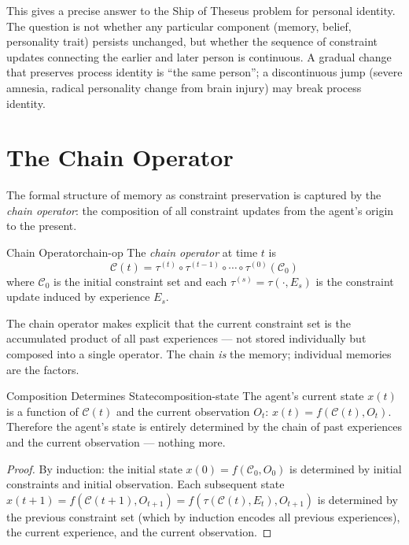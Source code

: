 \begin{remark}
  This gives a precise answer to the Ship of Theseus problem for
  personal identity. The question is not whether any particular component
  (memory, belief, personality trait) persists unchanged, but whether the
  sequence of constraint updates connecting the earlier and later person
  is continuous. A gradual change that preserves process identity is
  ``the same person''; a discontinuous jump (severe amnesia, radical
  personality change from brain injury) may break process identity.
\end{remark}

\section{The Chain Operator}

The formal structure of memory as constraint preservation is captured
by the \emph{chain operator}: the composition of all constraint updates
from the agent's origin to the present.

\begin{definition}{Chain Operator}{chain-op}
  The \emph{chain operator} at time $t$ is
  \[
    \mathcal{C}(t) = \tau^{(t)} \circ \tau^{(t-1)} \circ \cdots
    \circ \tau^{(0)}(\mathcal{C}_0)
  \]
  where $\mathcal{C}_0$ is the initial constraint set and each
  $\tau^{(s)} = \tau(\cdot, E_s)$ is the constraint update induced
  by experience $E_s$.
\end{definition}

The chain operator makes explicit that the current constraint set is
the accumulated product of all past experiences — not stored individually
but composed into a single operator. The chain \emph{is} the memory;
individual memories are the factors.

\begin{theorem}{Composition Determines State}{composition-state}
  The agent's current state $x(t)$ is a function of $\mathcal{C}(t)$
  and the current observation $O_t$:
  $x(t) = f(\mathcal{C}(t), O_t)$.
  Therefore the agent's state is entirely determined by the chain of
  past experiences and the current observation — nothing more.
\end{theorem}

\begin{proof}
  By induction: the initial state $x(0) = f(\mathcal{C}_0, O_0)$
  is determined by initial constraints and initial observation. Each
  subsequent state $x(t+1) = f(\mathcal{C}(t+1), O_{t+1}) =
  f(\tau(\mathcal{C}(t), E_t), O_{t+1})$ is determined by the
  previous constraint set (which by induction encodes all previous
  experiences), the current experience, and the current observation.
\end{proof}

